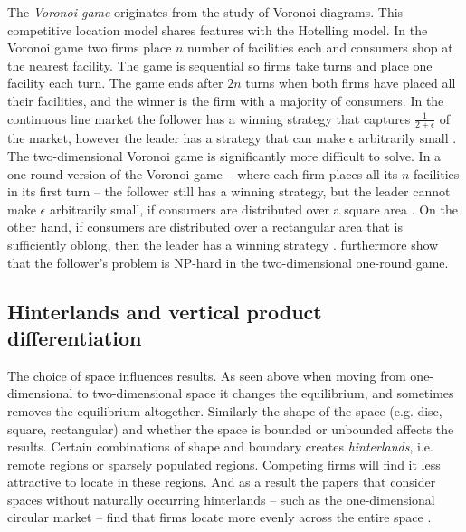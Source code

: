 \documentclass[preprint, 12pt]{elsarticle}
\begin{document}
The \emph{Voronoi game} originates from the study of Voronoi diagrams. This competitive location model shares features with the Hotelling model. In the Voronoi game two firms place $n$ number of facilities each and consumers shop at the nearest facility. The game is sequential so firms take turns and place one facility each turn. The game ends after $2n$ turns when both firms have placed all their facilities, and the winner is the firm with a majority of consumers. In the continuous line market the follower has a winning strategy that captures $\frac{1}{2+\epsilon}$ of the market, however the leader has a strategy that can make $\epsilon$ arbitrarily small \citep{Ahn_Cheng_Cheong_2001}. The two-dimensional Voronoi game is significantly more difficult to solve. In a one-round version of the Voronoi game -- where each firm places all its $n$ facilities in its first turn -- the follower still has a winning strategy, but the leader cannot make $\epsilon$ arbitrarily small, if consumers are distributed over a square area \citep[chapter~9]{Eiselt_Marianov_2011}. On the other hand, if consumers are distributed over a rectangular area that is sufficiently oblong, then the leader has a winning strategy \citep{Fekete_Meijer_2005}. \citet{Fekete_Meijer_2005} furthermore show that the follower's problem is NP-hard in the two-dimensional one-round game.

\subsection{Hinterlands and vertical product differentiation}

The choice of space influences results. As seen above when moving from one-dimensional to two-dimensional space it changes the equilibrium, and sometimes removes the equilibrium altogether. Similarly the shape of the space (e.g. disc, square, rectangular) and whether the space is bounded or unbounded affects the results. Certain combinations of shape and boundary creates \emph{hinterlands}, i.e. remote regions or sparsely populated regions. Competing firms will find it less attractive to locate in these regions. And as a result the papers that consider spaces without naturally occurring hinterlands -- such as the one-dimensional circular market -- find that firms locate more evenly across the entire space \citep{Eaton_Lipsey_1975, Salop_1979}.
\end{document}
